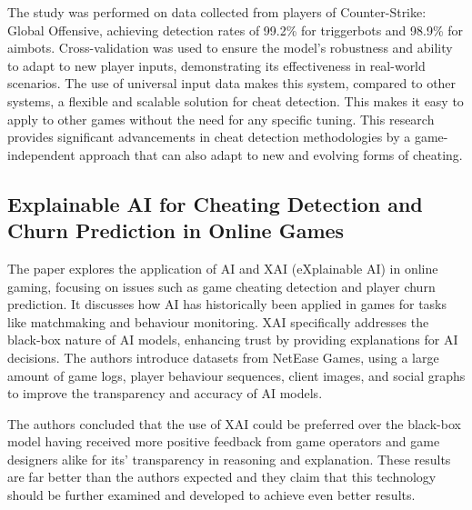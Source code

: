 The study was performed on data collected from players of Counter-Strike: Global Offensive, achieving detection rates of 99.2\% for triggerbots and 98.9\% for aimbots. Cross-validation was used to ensure the model’s robustness and ability to adapt to new player inputs, demonstrating its effectiveness in real-world scenarios. The use of universal input data makes this system, compared to other systems, a flexible and scalable solution for cheat detection. This makes it easy to apply to other games without the need for any specific tuning. This research provides significant advancements in cheat detection methodologies by a game-independent approach that can also adapt to new and evolving forms of cheating.

\subsection{Explainable AI for Cheating Detection and Churn Prediction in Online Games \cite{tao2022explainable}}

The paper explores the application of AI and XAI (eXplainable AI) in online gaming, focusing on issues such as game cheating detection and player churn prediction. It discusses how AI has historically been applied in games for tasks like matchmaking and behaviour monitoring. XAI specifically addresses the black-box nature of AI models, enhancing trust by providing explanations for AI decisions. The authors introduce datasets from NetEase Games, using a large amount of game logs, player behaviour sequences, client images, and social graphs to improve the transparency and accuracy of AI models.

The authors concluded that the use of XAI could be preferred over the black-box model having received more positive feedback from game operators and game designers alike for its’ transparency in reasoning and explanation. These results are far better than the authors expected and they claim that this technology should be further examined and developed to achieve even better results.
